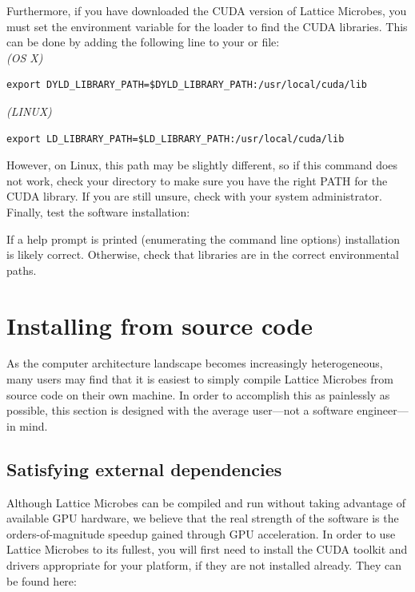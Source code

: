Furthermore, if you have downloaded the CUDA version of Lattice Microbes, you must set the environment variable for the loader to find the CUDA libraries.  This can be done by adding the following line to your  or  file:\\

{\it (OS X)}
{\small\begin{verbatim}
export DYLD_LIBRARY_PATH=$DYLD_LIBRARY_PATH:/usr/local/cuda/lib
\end{verbatim}}

{\it (LINUX)} 
{\small\begin{verbatim}
export LD_LIBRARY_PATH=$LD_LIBRARY_PATH:/usr/local/cuda/lib
\end{verbatim}}

However, on Linux, this path may be slightly different, so if this command does not work, check your directory to make sure you have the right  PATH for the CUDA library.  If you are still unsure, check with your system administrator.\\

Finally, test the software installation:\\

If a help prompt is printed (enumerating the command line options) installation is likely correct. Otherwise, check that libraries are in the correct environmental paths.

\section{Installing from source code} \label{sec:srcInstall}
\label{source}
As the computer architecture landscape becomes increasingly heterogeneous, many users may find that it is easiest to simply compile Lattice Microbes from source code on their own machine.  In order to accomplish this as painlessly as possible, this section is designed with the average user---not a software engineer---in mind.

\subsection{Satisfying external dependencies}

Although Lattice Microbes can be compiled and run without taking advantage of available GPU hardware, we believe that the real strength of the software is the orders-of-magnitude speedup gained through GPU acceleration.  In order to use Lattice Microbes to its fullest, you will first need to install the CUDA toolkit and drivers appropriate for your platform, if they are not installed already.  They can be found here:\\

